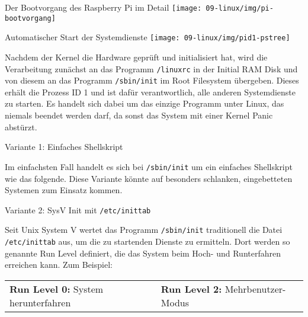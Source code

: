 \begin{frame}{Der Bootvorgang des Raspberry Pi im Detail}
    \texttt{[image: 09-linux/img/pi-bootvorgang]}
\end{frame}

{
\footnotesize

\begin{frame}[allowframebreaks]{Automatischer Start der Systemdienste}
    \texttt{[image: 09-linux/img/pid1-pstree]}
    \medskip

    \parbox{\linewidth}{
        Nachdem der Kernel die Hardware geprüft und initialisiert hat, wird die
        Verarbeitung zunächst an das Programm \texttt{/linuxrc} in der Initial
        RAM Disk und von diesem an das Programm \texttt{/sbin/init} im Root
        Filesystem übergeben. Dieses erhält die Prozess ID 1 und ist dafür
        verantwortlich, alle anderen Systemdienste zu starten. Es handelt sich
        dabei um das einzige Programm unter Linux, das niemals beendet werden
        darf, da sonst das System mit einer Kernel Panic abstürzt.
    }

    \framebreak

    \begin{block}{Variante 1: Einfaches Shellskript}
        \smallskip
        \parbox{\linewidth}{
            Im einfachsten Fall handelt es sich bei \texttt{/sbin/init} um ein
            einfaches Shellskript wie das folgende. Diese Variante könnte auf
            besonders schlanken, eingebetteten Systemen zum Einsatz kommen.
        }

        
    \end{block}

    \framebreak

    \begin{block}{Variante 2: SysV Init mit \texttt{/etc/inittab}}
        \smallskip
        \parbox{\linewidth}{
            Seit Unix System V wertet das Programm \texttt{/sbin/init} traditionell
            die Datei \texttt{/etc/inittab} aus, um die zu startenden Dienste zu
            ermitteln. Dort werden so genannte Run Level definiert, die das System
            beim Hoch- und Runterfahren erreichen kann. Zum Beispiel:
        }

        \vfill
        \begin{center}
            \scriptsize
            \begin{tabularx}{.8\textwidth}{X X}
                    \textbf{Run Level 0:} System herunterfahren &
                    \textbf{Run Level 2:} Mehrbenutzer-Modus \\


\end{tabularx}
\end{center}
\end{block}
\end{frame}}
